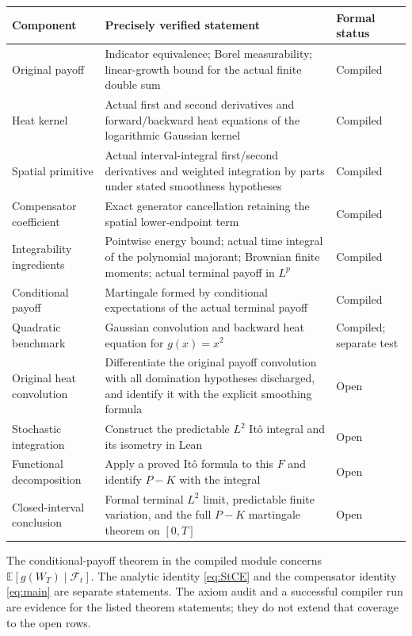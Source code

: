 \documentclass[11pt,letterpaper]{article}
\newcommand{\E}{\mathbb E}
\newcommand{\F}{\mathcal F}
\begin{document}
\begin{center}
\small
\begin{tabularx}{\linewidth}{@{}p{.24\linewidth}Xp{.18\linewidth}@{}}\toprule
Component & Precisely verified statement & Formal status\\\midrule
Original payoff & Indicator equivalence; Borel measurability; linear-growth bound for the actual finite double sum & Compiled\\
Heat kernel & Actual first and second derivatives and forward/backward heat equations of the logarithmic Gaussian kernel & Compiled\\
Spatial primitive & Actual interval-integral first/second derivatives and weighted integration by parts under stated smoothness hypotheses & Compiled\\
Compensator coefficient & Exact generator cancellation retaining the spatial lower-endpoint term & Compiled\\
Integrability ingredients & Pointwise energy bound; actual time integral of the polynomial majorant; Brownian finite moments; actual terminal payoff in $L^p$ & Compiled\\
Conditional payoff & Martingale formed by conditional expectations of the actual terminal payoff & Compiled\\
Quadratic benchmark & Gaussian convolution and backward heat equation for $g(x)=x^2$ & Compiled; separate test\\\midrule
Original heat convolution & Differentiate the original payoff convolution with all domination hypotheses discharged, and identify it with the explicit smoothing formula & Open\\
Stochastic integration & Construct the predictable $L^2$ It\^o integral and its isometry in Lean & Open\\
Functional decomposition & Apply a proved It\^o formula to this $F$ and identify $P-K$ with the integral & Open\\
Closed-interval conclusion & Formal terminal $L^2$ limit, predictable finite variation, and the full $P-K$ martingale theorem on $[0,T]$ & Open\\\bottomrule
\end{tabularx}
\end{center}
The conditional-payoff theorem in the compiled module concerns $\E[g(W_T)\mid\F_t]$. The analytic identity \eqref{eq:StCE} and the compensator identity \eqref{eq:main} are separate statements. The axiom audit and a successful compiler run are evidence for the listed theorem statements; they do not extend that coverage to the open rows.
\end{document}
